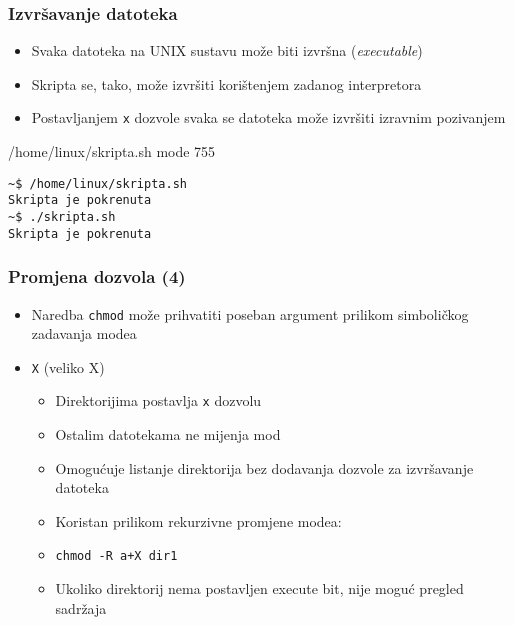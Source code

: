 \documentclass[table,usenames,dvipsnames] {beamer}
\newcommand{\shell}[1]{\texttt{#1}}
\begin{document}
\begin{frame}[fragile]
\frametitle{Izvršavanje datoteka}
\begin{itemize}
  \item Svaka datoteka na UNIX sustavu može biti izvršna (\textit{executable})
  \item Skripta se, tako, može izvršiti korištenjem zadanog interpretora
\end{itemize}
\begin{itemize}
  \item Postavljanjem \shell{x} dozvole svaka se datoteka može izvršiti izravnim pozivanjem
\end{itemize}
\vfill
\begin{block}{/home/linux/skripta.sh \hfill mode 755}
  \makeset
\end{block}
\vfill
\begin{Verbatim}[fontsize=\footnotesize]
~$ /home/linux/skripta.sh
Skripta je pokrenuta
~$ ./skripta.sh
Skripta je pokrenuta
\end{Verbatim}
\end{frame}


\begin{frame}
  \frametitle{Promjena dozvola (4)}
\begin{itemize}
  \item Naredba \shell{chmod} može prihvatiti poseban argument prilikom simboličkog zadavanja modea
\end{itemize}
\begin{itemize}
  \item[] \shell{X} (veliko X)
   \begin{itemize}
    \item Direktorijima postavlja \shell{x} dozvolu
    \item Ostalim datotekama ne mijenja mod
    \item Omogućuje listanje direktorija bez dodavanja dozvole za izvršavanje datoteka
    \item Koristan prilikom rekurzivne promjene modea:
    \item[] \hspace{1em} \shell{chmod -R a+X dir1}
    \item Ukoliko direktorij nema postavljen execute bit, nije moguć pregled sadržaja
   \end{itemize}
\end{itemize}
\end{frame}
\end{document}
